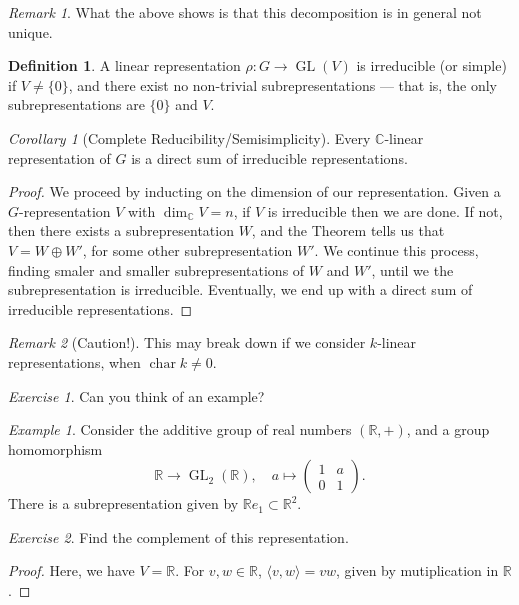 \documentclass[a4paper]{report}
\theoremstyle{definition}
\newtheorem{definition}{Definition}
\theoremstyle{remark}
\newtheorem{remark}{Remark}
\theoremstyle{proposition}
\theoremstyle{conjecture}
\theoremstyle{lemma}
\theoremstyle{corollary}
\newtheorem{corollary}{Corollary}
\theoremstyle{exercise}
\newtheorem{exercise}{Exercise}
\theoremstyle{example}
\newtheorem{example}{Example}
\newcommand{\C}{\mathbb{C}}
\newcommand{\on}{\operatorname}
\begin{document}
\begin{remark}
    What the above shows is that this decomposition is in general not unique.
\end{remark}

\begin{definition}
    A linear representation $\rho : G \to \on{GL}(V)$ is irreducible (or simple)
    if $V \neq \lbrace 0\rbrace$, and there exist no non-trivial 
    subrepresentations --- that is, the only subrepresentations are 
    $\lbrace 0 \rbrace$ and $V$.
\end{definition}

\begin{corollary}[Complete Reducibility/Semisimplicity]
    Every $\C$-linear representation of $G$ is a direct sum of irreducible
    representations. 
\end{corollary}

\begin{proof}
    We proceed by inducting on the dimension of our representation.
    Given a $G$-representation $V$ with $\dim_\C V = n$, if $V$ 
    is irreducible then we are done. If not, then there exists a 
    subrepresentation $W$, and the Theorem tells us that $V = W \oplus W'$,
    for some other subrepresentation $W'$. We continue this process,
    finding smaler and smaller subrepresentations of $W$ and $W'$, until
    we the subrepresentation is irreducible. Eventually, we end up with a 
    direct sum of irreducible representations.
\end{proof}

\begin{remark}[Caution!]
    This may break down if we consider $k$-linear representations, when 
    $\on{char}k \neq 0$. 
\end{remark}
\begin{exercise}
    Can you think of an example?
\end{exercise}

\begin{example}
    Consider the additive group of real numbers $(\mathbb{R},+)$, 
    and a group homomorphism
    $$\mathbb{R} \longrightarrow \on{GL}_2(\mathbb{R}), \quad a\longmapsto \begin{pmatrix}
        1&a\\
        0&1
    \end{pmatrix}.$$
    There is a subrepresentation given by 
    $\mathbb{R}e_1 \subset \mathbb{R}^2$.
    \begin{exercise}
        Find the complement of this representation.
    \end{exercise}
    \begin{proof}
        Here, we have $V = \mathbb{R}$. For $v,w \in \mathbb{R}$,
        $\langle v,w\rangle = vw$, given by mutiplication in $\mathbb{R}$.
    \end{proof}
\end{example}
\end{document}
